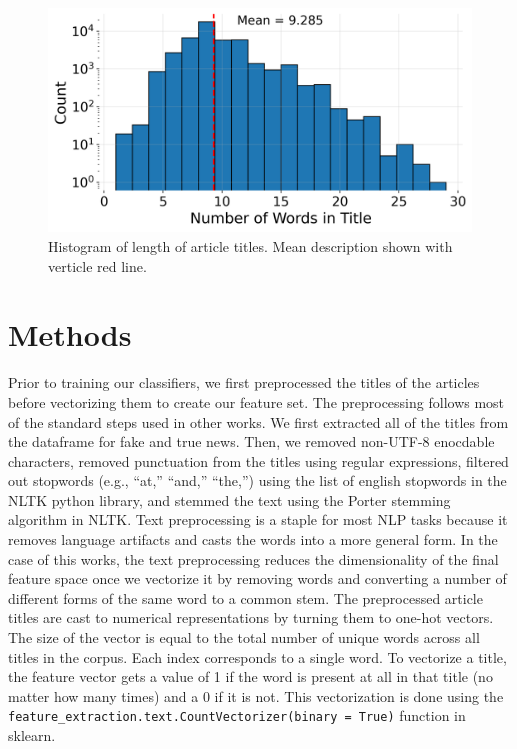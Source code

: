 \documentclass[12pt]{article}
\begin{document}
    \begin{figure}[htbp]
        \centerline{\includegraphics[scale=1]{../results/length_of_description.png}}
        \caption{Histogram of length of article titles. Mean description shown with verticle red line.}
        \label{fig:1}
\end{figure}	
	
	\section{Methods}
	
    Prior to training our classifiers, we first preprocessed the titles of the articles before vectorizing them to create our feature set. The preprocessing follows most of the standard steps used in other works\cite{oshikawa:2020}. We first extracted all of the titles from the dataframe for fake and true news. Then, we removed non-UTF-8 enocdable characters, removed punctuation from the titles using regular expressions, filtered out stopwords (e.g., ``at,'' ``and,'' ``the,'') using the list of english stopwords in the NLTK python library, and stemmed the text using the Porter stemming algorithm in NLTK. Text preprocessing is a staple for most NLP tasks because it removes language artifacts and casts the words into a more general form. In the case of this works, the text preprocessing reduces the dimensionality of the final feature space once we vectorize it by removing words and converting a number of different forms of the same word to a common stem. The preprocessed article titles are cast to numerical representations by turning them to one-hot vectors. The size of the vector is equal to the total number of unique words across all titles in the corpus. Each index corresponds to a single word. To vectorize a title, the feature vector gets a value of 1 if the word is present at all in that title (no matter how many times) and a 0 if it is not. This vectorization is done using the \texttt{feature\_extraction.text.CountVectorizer(binary = True)} function in sklearn. 
	
\end{document}
